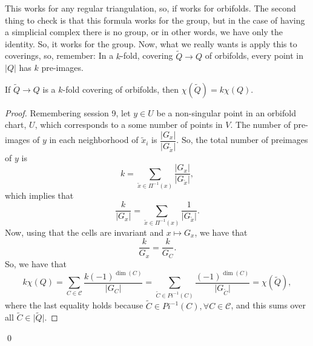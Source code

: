 This works for any regular triangulation, so, if works for orbifolds. \newline
The second thing to check is that this formula works for the group, but in the case of having a simplicial complex there is no group, or in other words, we have only the identity. So, it works for the group. \newline
Now, what we really wants is apply this to coverings, so, remember: \newline
In a $k$-fold, covering $\tilde{Q} \rightarrow Q$ of orbifolds, every point in $\vert Q \vert$ has $k$ pre-images. \newline
\begin{theorem} If $\tilde{Q} \rightarrow Q$ is a $k$-fold covering of orbifolds, then $\chi(\tilde{Q}) = k \chi (Q)$.
\end{theorem}
\begin{proof} Remembering session 9, let $y \in U$ be a non-singular point in an orbifold chart, $U$, which corresponds to a some number of points in $V$. \newline
The number of pre-images of $y$ in each neighborhood of $\tilde{x}_{i}$ is $\dfrac{\vert G_{x} \vert}{\vert G_{\tilde{x}} \vert}$. \newline
So, the total number of preimages of $y$ is $$k = \sum_{\tilde{x} \in \Pi ^{-1}(x)} \frac{\vert G_{x} \vert}{\vert G_{\tilde{x}} \vert},$$ which implies that $$\frac{k}{\vert G_{x} \vert} = \sum _{\tilde{x} \in \Pi ^{-1}(x)} \frac{1}{\vert G_{\tilde{x}} \vert}.$$ Now, using that the cells are invariant and $x \mapsto G_{x}$, we have that $$\frac{k}{G_{x}} = \frac{k}{G_{C}}.$$ So, we have that $$k \chi (Q) = \sum_{C \in \mathcal{C}} \frac{k (-1)^{\dim (C)}}{\vert G_{C} \vert} = \sum _{\tilde{C} \in Pi^{-1}(C)} \frac{(-1)^{\dim (C)}}{\vert G_{\tilde{C}} \vert} = \chi (\tilde{Q}),$$ where the last equality holds because $\tilde{C} \in Pi^{-1}(C), \forall C \in \mathcal{C}$, and this sums over all $\tilde{C} \in \vert \tilde{Q} \vert$.
\end{proof}
\qed

